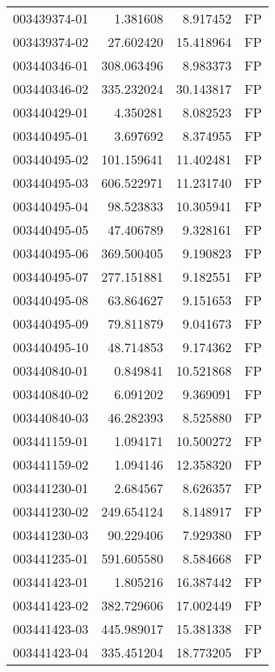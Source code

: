 \begin{tabular}{lrrl}
003439374-01 &    1.381608 &       8.917452 &   FP \\
003439374-02 &   27.602420 &      15.418964 &   FP \\
003440346-01 &  308.063496 &       8.983373 &   FP \\
003440346-02 &  335.232024 &      30.143817 &   FP \\
003440429-01 &    4.350281 &       8.082523 &   FP \\
003440495-01 &    3.697692 &       8.374955 &   FP \\
003440495-02 &  101.159641 &      11.402481 &   FP \\
003440495-03 &  606.522971 &      11.231740 &   FP \\
003440495-04 &   98.523833 &      10.305941 &   FP \\
003440495-05 &   47.406789 &       9.328161 &   FP \\
003440495-06 &  369.500405 &       9.190823 &   FP \\
003440495-07 &  277.151881 &       9.182551 &   FP \\
003440495-08 &   63.864627 &       9.151653 &   FP \\
003440495-09 &   79.811879 &       9.041673 &   FP \\
003440495-10 &   48.714853 &       9.174362 &   FP \\
003440840-01 &    0.849841 &      10.521868 &   FP \\
003440840-02 &    6.091202 &       9.369091 &   FP \\
003440840-03 &   46.282393 &       8.525880 &   FP \\
003441159-01 &    1.094171 &      10.500272 &   FP \\
003441159-02 &    1.094146 &      12.358320 &   FP \\
003441230-01 &    2.684567 &       8.626357 &   FP \\
003441230-02 &  249.654124 &       8.148917 &   FP \\
003441230-03 &   90.229406 &       7.929380 &   FP \\
003441235-01 &  591.605580 &       8.584668 &   FP \\
003441423-01 &    1.805216 &      16.387442 &   FP \\
003441423-02 &  382.729606 &      17.002449 &   FP \\
003441423-03 &  445.989017 &      15.381338 &   FP \\
003441423-04 &  335.451204 &      18.773205 &   FP \\

\end{tabular}
